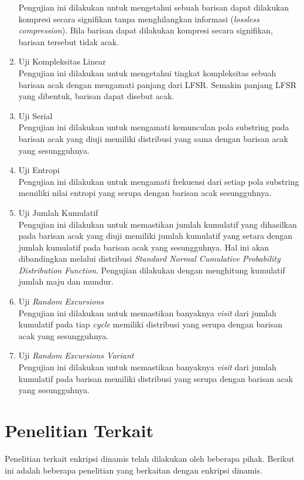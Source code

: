 \begin{enumerate}
  Pengujian ini dilakukan untuk mengetahui sebuah barisan dapat dilakukan kompresi secara signifikan tanpa menghilangkan informasi (\emph{lossless compression}). Bila barisan dapat dilakukan kompresi secara signifikan, barisan tersebut tidak acak.
  \item Uji Kompleksitas Linear \\
  Pengujian ini dilakukan untuk mengetahui tingkat kompleksitas sebuah barisan acak dengan mengamati panjang dari LFSR. Semakin panjang LFSR yang dibentuk, barisan dapat disebut acak.
  \item Uji Serial \\
  Pengujian ini dilakukan untuk mengamati kemunculan pola substring pada barisan acak yang diuji memiliki distribusi yang sama dengan barisan acak yang sesungguhnya.
  \item Uji Entropi \\
  Pengujian ini dilakukan untuk mengamati frekuensi dari setiap pola substring memiliki nilai entropi yang serupa dengan barisan acak sesungguhnya.
  \item Uji Jumlah Kumulatif \\
  Pengujian ini dilakukan untuk memastikan jumlah kumulatif yang dihasilkan pada barisan acak yang diuji memiliki jumlah kumulatif yang setara dengan jumlah kumulatif pada barisan acak yang sesungguhnya. Hal ini akan dibandingkan melalui distribusi \emph{Standard Normal Cumulative Probability Distribution Function}. Pengujian dilakukan dengan menghitung kumulatif jumlah maju dan mundur.
  \item Uji \emph{Random Excursions} \\
  Pengujian ini dilakukan untuk memastikan banyaknya \emph{visit} dari jumlah kumulatif pada tiap \emph{cycle} memiliki distribusi yang serupa dengan barisan acak yang sesungguhnya.
  \item Uji \emph{Random Excursions Variant} \\
  Pengujian ini dilakukan untuk memastikan banyaknya \emph{visit} dari jumlah kumulatif pada barisan memiliki distribusi yang serupa dengan barisan acak yang sesungguhnya.
\end{enumerate}


\section{Penelitian Terkait}

Penelitian terkait enkripsi dinamis telah dilakukan oleh beberapa pihak. Berikut ini adalah beberapa penelitian yang berkaitan dengan enkripsi dinamis. 

